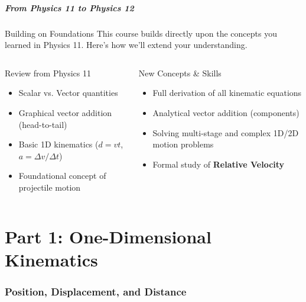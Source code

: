\documentclass{beamer}
\begin{document}
\begin{frame}
\frametitle{From Physics 11 to Physics 12}
\begin{block}{Building on Foundations}
This course builds directly upon the concepts you learned in Physics 11. Here's how we'll extend your understanding.
\end{block}

\begin{columns}[T]
    \begin{column}{0.5\textwidth}
        \alert{Review from Physics 11}
        \begin{itemize}
            \item<2-> Scalar vs. Vector quantities
            \item<3-> Graphical vector addition (head-to-tail)
            \item<4-> Basic 1D kinematics ($d = vt$, $a = \Delta v / \Delta t$)
            \item<5-> Foundational concept of projectile motion
        \end{itemize}
    \end{column}
    \begin{column}{0.5\textwidth}
        \alert{New Concepts \& Skills}
        \begin{itemize}
            \item<2-> Full derivation of all kinematic equations
            \item<3-> Analytical vector addition (components)
            \item<4-> Solving multi-stage and complex 1D/2D motion problems
            \item<5-> Formal study of \textbf{Relative Velocity}
        \end{itemize}
    \end{column}
\end{columns}
\end{frame}

\part{Part 1: One-Dimensional Kinematics}

\section{Position, Displacement, and Distance}
\end{document}
